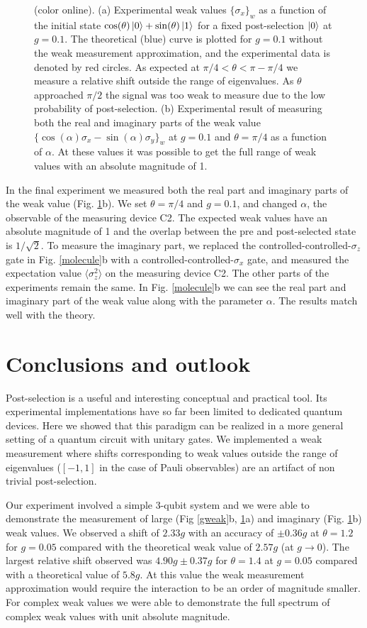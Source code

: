 \documentclass[aps,pra,12pt,onecolumn,showpacs,superscriptaddress,floatfix,footinbib,subfigure]{revtex4}
\def\ket#1{\mathinner{|{#1}\rangle}}
\begin{document}
\begin{figure}[h]
\caption{(color online). (a) Experimental weak values $\{\sigma_x\}_w$ as a function of the initial state $\cos(\theta)\ket{0}+\sin(\theta)\ket{1}$  for a fixed post-selection $\ket{0}$  at $g=0.1$. The theoretical  (blue) curve is plotted for $g=0.1$  without the weak measurement approximation, and the experimental data is denoted by red circles. As expected at  $\pi/4<\theta<\pi-\pi/4$ we measure a relative shift outside the range of eigenvalues. As $\theta$ approached $\pi/2$ the signal was too weak to measure due to the low probability of post-selection.  (b) Experimental result of measuring both the real and imaginary parts of the weak value $\{\cos(\alpha)\sigma_x-\sin(\alpha)\sigma_y\}_w$ at $g=0.1$ and $\theta = \pi/4$ as a function of $\alpha$.  At these values it was possible to get the full range of weak values with an absolute magnitude of 1.}\label{thetaweak}
\end{figure}

In the final experiment we  measured both the real part and imaginary parts of the weak value (Fig. \ref{thetaweak}b).  We set $\theta = \pi/4$ and $g=0.1$, and changed $\alpha$, the observable of the measuring device C2. The expected weak values have an absolute magnitude of 1 and the  overlap between the pre and post-selected state is $1/\sqrt{2}$.  To measure the imaginary part, we replaced the controlled-controlled-$\sigma_z$ gate in Fig. \ref{molecule}b with a controlled-controlled-$\sigma_x$ gate, and measured the expectation value $\langle\sigma_z^2\rangle$ on the measuring device C2. The other parts of the experiments remain the same. In  Fig. \ref{molecule}b we can see the real part and imaginary part of the weak value along with the parameter $\alpha$. The results match well with the theory.


\section{Conclusions and outlook}
Post-selection is a useful and interesting conceptual and practical tool. Its experimental implementations have so far  been limited to dedicated quantum devices. Here we showed that this paradigm can be realized in a more general setting of a quantum circuit with unitary gates. We  implemented a weak measurement where shifts corresponding to weak values outside the range of eigenvalues ($[-1,1]$  in the case of Pauli observables) are an artifact of non trivial post-selection.

Our experiment involved a simple 3-qubit system and we were able to demonstrate the measurement of large (Fig  \ref{gweak}b, \ref{thetaweak}a) and imaginary (Fig. \ref{thetaweak}b) weak values.  We observed  a shift of $2.33g$ with an accuracy of $\pm0.36g$  at $\theta=1.2$ for $g=0.05$    compared with the theoretical weak value of  $2.57g$ (at $g\rightarrow 0$). The largest relative shift observed was  $4.90g\pm  0.37g$ for  $\theta=1.4$  at   $g=0.05$ compared with a theoretical value of  $5.8g$. At this value the  weak measurement approximation would require the interaction to be an order of magnitude smaller.   For complex weak values we were able to demonstrate  the full spectrum of complex weak values with unit  absolute magnitude.
\end{document}
